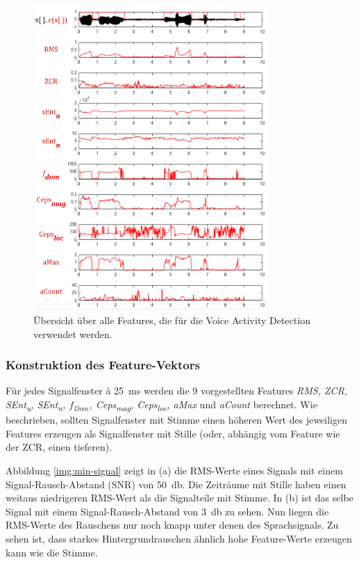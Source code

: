 \begin{figure}[h!]
	\centering
	\includegraphics[width=0.8\textwidth]{bilder/allFeatures01.png}
	\caption{Übersicht über alle Features, die für die Voice Activity Detection verwendet werden.}
	\label{img:vadAllFeatures}
\end{figure}

\subsubsection{Konstruktion des Feature-Vektors}

Für jedes Signalfenster à \SI{25}{\milli\second} werden die 9 vorgestellten Features \emph{RMS, ZCR, SEnt\textsubscript{u}, SEnt\textsubscript{n}, $f_{Dom}$, Ceps\textsubscript{mag}, Ceps\textsubscript{loc}, aMax} und \emph{aCount} berechnet. Wie beschrieben, sollten Signalfenster mit Stimme einen höheren Wert des jeweiligen Features erzeugen als Signalfenster mit Stille (oder, abhängig vom Feature wie der ZCR, einen tieferen). 

Abbildung \ref{img:min-signal} zeigt in (a) die RMS-Werte eines Signals mit einem Signal-Rausch-Abstand (SNR) von \SI{50}{\decibel}. Die Zeiträume mit Stille haben einen weitaus niedrigeren RMS-Wert als die Signalteile mit Stimme. In (b) ist das selbe Signal mit einem Signal-Rausch-Abstand von \SI{3}{\decibel} zu sehen. Nun liegen die RMS-Werte des Rauschens nur noch knapp unter denen des Sprachsignals. Zu sehen ist, dass starkes Hintergrundrauschen ähnlich hohe Feature-Werte erzeugen kann wie die Stimme.

